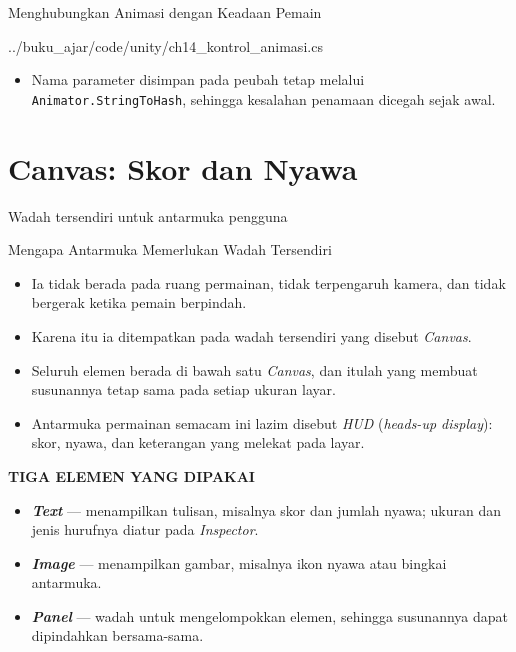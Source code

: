 \documentclass[aspectratio=169,10pt]{beamer}
\begin{document}
\begin{frame}[fragile]{Menghubungkan Animasi dengan Keadaan Pemain}

  {../buku_ajar/code/unity/ch14_kontrol_animasi.cs}
\begin{itemize}
  \item Nama parameter disimpan pada peubah tetap melalui
        \texttt{Animator.StringToHash}, sehingga kesalahan penamaan dicegah
        sejak awal.
\end{itemize}
\end{frame}

\section{Canvas: Skor dan Nyawa}
  {Wadah tersendiri untuk antarmuka pengguna}

\begin{frame}{Mengapa Antarmuka Memerlukan Wadah Tersendiri}
\begin{itemize}
  \item Ia tidak berada pada ruang permainan, tidak terpengaruh kamera, dan
        tidak bergerak ketika pemain berpindah.
  \item Karena itu ia ditempatkan pada wadah tersendiri yang disebut
        \emph{Canvas}.
  \item Seluruh elemen berada di bawah satu \emph{Canvas}, dan itulah yang
        membuat susunannya tetap sama pada setiap ukuran layar.
  \item Antarmuka permainan semacam ini lazim disebut \emph{HUD}
        (\emph{heads-up display}): skor, nyawa, dan keterangan yang melekat
        pada layar.
\end{itemize}
\vspace{0.10cm}
{\fontsize{7}{8.5}\selectfont\bfseries\color{ubAccent}TIGA ELEMEN YANG DIPAKAI}\par
\vspace{0.04cm}
\begin{itemize}
  \item \textbf{\emph{Text}} --- menampilkan tulisan, misalnya skor dan jumlah
        nyawa; ukuran dan jenis hurufnya diatur pada \emph{Inspector}.
  \item \textbf{\emph{Image}} --- menampilkan gambar, misalnya ikon nyawa atau
        bingkai antarmuka.
  \item \textbf{\emph{Panel}} --- wadah untuk mengelompokkan elemen, sehingga
        susunannya dapat dipindahkan bersama-sama.
\end{itemize}
\end{frame}
\end{document}
